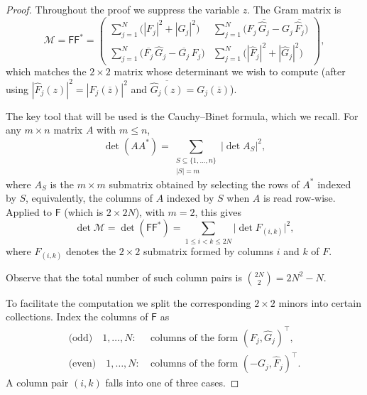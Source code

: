 \documentclass[10pt,a4paper]{amsart}
\begin{document}
\begin{proof}
Throughout the proof we suppress the variable $z$. The Gram matrix is
\[
\mathcal{M} =  \mathsf{F}\mathsf{F}^* =
\begin{pmatrix}
\displaystyle\sum_{j=1}^{N}\bigl(|F_j|^2 + |G_j|^2\bigr) & \displaystyle\sum_{j=1}^{N}\bigl(F_j\,\overline{\hat G_j} - G_j\,\overline{\hat F_j}\bigr)
 \\[0.6em]
\displaystyle\sum_{j=1}^{N}\bigl(\overline{F_j}\,\hat G_j - \overline{G_j}\,\hat F_j\bigr) &
\displaystyle\sum_{j=1}^{N}\bigl(|\hat F_j|^2 + |\hat G_j|^2\bigr)
\end{pmatrix},
\]
which matches the $2 \times 2$ matrix whose determinant we wish to compute (after using $|\hat F_j(z)|^2 = |F_j(\overline z)|^2$ and $\overline{\hat G_j(z)} = G_j(\overline z)$).

\bigskip

The key tool that will be used is the Cauchy--Binet formula, which we recall.  For any $m \times n$ matrix $A$ with $m \le n$,
\begin{equation}\label{eq:CB}
\det(A A^*) = \sum_{\substack{S \subseteq \{1,\ldots,n\} \\ |S| = m}} \bigl|\det A_S\bigr|^2,
\end{equation}
where $A_S$ is the $m \times m$ submatrix obtained by selecting the rows of $A^*$ indexed by $S$, equivalently, the columns of $A$ indexed by $S$ when $A$ is read row-wise. Applied to $\mathsf{F}$ (which is $2 \times 2N$), with $m = 2$, this gives
\begin{equation}\label{eq:CB-applied}
\det\mathcal{M} = \det( \mathsf{F} \mathsf{F}^*) = \sum_{1 \le i < k \le 2N} \bigl|\det F_{(i,k)}\bigr|^2,
\end{equation}
where $ F_{(i,k)}$ denotes the $2 \times 2$ submatrix formed by columns $i$ and $k$ of $F$.

Observe that the total number of such column pairs is $\binom{2N}{2} = 2N^2 - N$.

\bigskip

To facilitate the computation we split the corresponding $2 \times 2$ minors into certain collections. Index the columns of $\mathsf{F}$ as
\begin{align*}
\text{(odd)} \quad 1,\ldots,N: & \ \text{columns of the form } (F_j, \hat G_j)^{\top},\\
\text{(even)} \quad 1,\ldots,N:&  \ \text{columns of the form } (-G_{j}, \hat F_{j})^{\top}.
\end{align*}
A column pair $(i,k)$ falls into one of three cases.


\end{proof}
\end{document}
